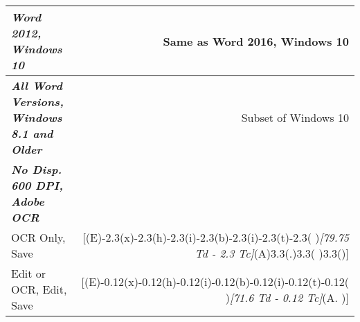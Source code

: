 \begin{tabular}{l@{\hskip -6cm}r}
  \midrule {\emph{\textbf{Word 2012, Windows 10}}} &
  Same as Word 2016, Windows 10 \\
  \midrule {\emph{\textbf{All Word Versions, Windows 8.1 and Older}}} &
  Subset of Windows 10 \\
  \midrule {\emph{\textbf{No Disp. 600 DPI, Adobe OCR}}}  \\
    {OCR Only, Save} &
    [(E)-2.3(x)-2.3(h)-2.3(i)-2.3(b)-2.3(i)-2.3(t)-2.3( )\emph{[79.75 Td - 2.3 Tc]}(A)3.3(.)3.3( )3.3()] \\
    {Edit or OCR, Edit, Save} &
    [(E)-0.12(x)-0.12(h)-0.12(i)-0.12(b)-0.12(i)-0.12(t)-0.12( )\emph{[71.6 Td - 0.12 Tc]}(A. )] \\
  \bottomrule
\end{tabular}
